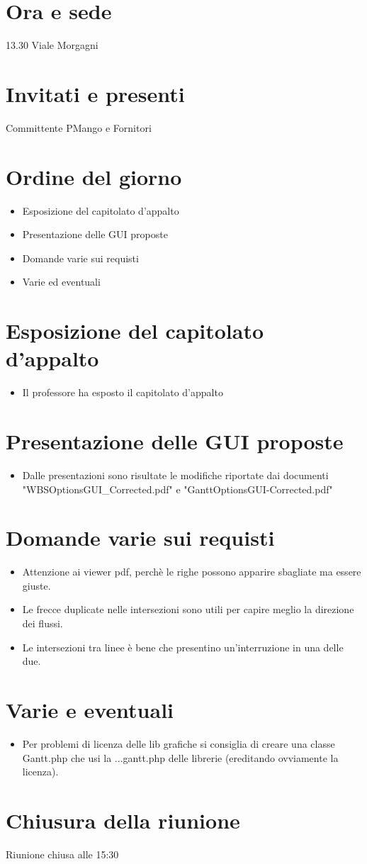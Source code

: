 \section*{Ora e sede}
13.30 Viale Morgagni

\section*{Invitati e presenti}
Committente PMango e Fornitori

\section*{Ordine del giorno}
\begin{itemize}
  \item Esposizione del capitolato d'appalto
  \item Presentazione delle GUI proposte
  \item Domande varie sui requisti
  \item Varie ed eventuali
\end{itemize}

\section*{Esposizione del capitolato d'appalto}
\begin{itemize}
  \item Il professore ha esposto il capitolato d'appalto  
\end{itemize}

\section*{Presentazione delle GUI proposte}
\begin{itemize}
  \item Dalle presentazioni sono risultate le modifiche riportate dai documenti
  "WBSOptionsGUI\_Corrected.pdf" e "GanttOptionsGUI-Corrected.pdf"
\end{itemize}

\section*{Domande varie sui requisti}
\begin{itemize}
  \item Attenzione ai viewer pdf, perchè le righe possono apparire sbagliate ma essere giuste.
  \item Le frecce duplicate nelle intersezioni sono utili per capire meglio la direzione dei flussi.
  \item Le intersezioni tra linee è bene che presentino un'interruzione in una delle due.
\end{itemize}
 	 
\section*{Varie e eventuali}
\begin{itemize}
  \item Per problemi di licenza delle lib grafiche si consiglia di creare una classe Gantt.php che usi la ...gantt.php delle librerie (ereditando ovviamente la licenza).   
\end{itemize}

\section*{Chiusura della riunione}
Riunione chiusa alle 15:30